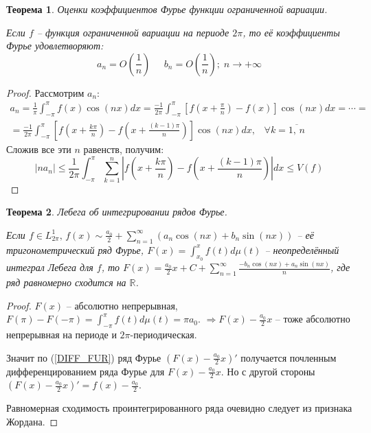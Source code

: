 \documentclass[a4paper,12pt]{article}
\renewcommand{\leq}{\ensuremath{\leqslant}}
\theoremstyle{plain}
\newtheorem{theorem}{Теорема}[section]
\theoremstyle{definition}
\theoremstyle{remark}
\begin{document}
\begin{theorem}
	Оценки коэффициентов Фурье функции ограниченной вариации.

	Если $f$ -- функция ограниченной вариации на периоде $2\pi$, то её коэффициенты Фурье удовлетворяют:
	\[a_n = O\left(\frac{1}{n}\right)\;\;\;\;\; b_n = O\left(\frac{1}{n}\right);\; n \to +\infty\]
\end{theorem}

\begin{proof}
	Рассмотрим $a_n$:
	\begin{align*}
		a_n = \frac{1}{\pi}\int_{-\pi}^\pi f(x)\cos(nx)dx = \frac{-1}{2\pi}\int_{-\pi}^\pi \left[f(x + \frac{\pi}{n}) - f(x)\right]\cos(nx)dx = \cdots = \\
		= \frac{-1}{2\pi}\int_{-\pi}^\pi \left[f\left(x + \frac{k\pi}{n}\right) - f\left(x + \frac{(k - 1)\pi}{n}\right)\right]\cos(nx)dx,\;\;\; \forall k = \overline{1,\,n}
	\end{align*}
	Сложив все эти $n$ равенств, получим:
	\[
		|na_n| \leq \frac{1}{2\pi} \int_{-\pi}^\pi \sum_{k = 1}^n \left|f\left(x + \frac{k\pi}{n}\right) - f\left(x + \frac{(k - 1)\pi}{n}\right)\right|dx \leq V(f)
	\]
\end{proof}

\begin{theorem}
	Лебега об интегрировании рядов Фурье.

	Если $f \in L^1_{2\pi},\, f(x) \sim \frac{a_0}{2} + \sum_{n = 1}^\infty (a_n\cos(nx) + b_n\sin(nx))$ -- её тригонометрический ряд Фурье, $F(x) = \int_{x_0}^x f(t)d\mu(t)$ -- неопределённый интеграл Лебега для $f$, то $F(x) = \frac{a_0}{2}x + C + \sum_{n = 1}^\infty \frac{-b_n\cos(nx) + a_n\sin(nx)}{n}$, где ряд равномерно сходится на $\mathbb{R}$.
\end{theorem}

\begin{proof}
	$F(x)$ -- абсолютно непрерывная, $F(\pi) - F(-\pi) = \int_{-\pi}^\pi f(t)d\mu(t) = \pi a_0$. $\Rightarrow F(x) - \frac{a_0}{2}x$ -- тоже абсолютно непрерывная на периоде и $2\pi$-периодическая.

	Значит по (\ref{DIFF_FUR}) ряд Фурье $\left(F(x) - \frac{a_0}{2}x\right)'$ получается почленным дифференцированием ряда Фурье для $F(x) - \frac{a_0}{2}x$. Но с другой стороны $\left(F(x) - \frac{a_0}{2}x\right)' = f(x) - \frac{a_0}{2}$.

	Равномерная сходимость проинтегрированного ряда очевидно следует из признака Жордана.
\end{proof}
\end{document}
